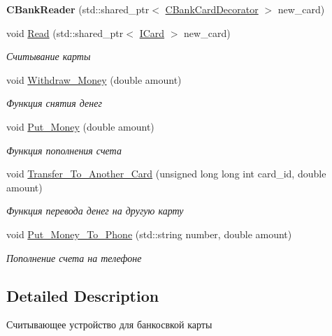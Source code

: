 \begin{DoxyCompactItemize}
\item 
{\bfseries C\+Bank\+Reader} (std\+::shared\+\_\+ptr$<$ \hyperlink{classCBankCardDecorator}{C\+Bank\+Card\+Decorator} $>$ new\+\_\+card)\hypertarget{classCBankReader_a27fe18f60a46d95d8e8b022785bec641}{}\label{classCBankReader_a27fe18f60a46d95d8e8b022785bec641}

\item 
void \hyperlink{classCBankReader_a69ed3dcbbd5fe76cc8b1e1db2b841128}{Read} (std\+::shared\+\_\+ptr$<$ \hyperlink{classICard}{I\+Card} $>$ new\+\_\+card)
\begin{DoxyCompactList}\small\item\em Считывание карты \end{DoxyCompactList}\item 
void \hyperlink{classCBankReader_afd2d3b073729079d75460e4cfde0ccbc}{Withdraw\+\_\+\+Money} (double amount)
\begin{DoxyCompactList}\small\item\em Функция снятия денег \end{DoxyCompactList}\item 
void \hyperlink{classCBankReader_a1a64f1bc129b6238ce382317d3ff8d24}{Put\+\_\+\+Money} (double amount)
\begin{DoxyCompactList}\small\item\em Функция пополнения счета \end{DoxyCompactList}\item 
void \hyperlink{classCBankReader_aabeebe40ce562468fa876e83638a2c04}{Transfer\+\_\+\+To\+\_\+\+Another\+\_\+\+Card} (unsigned long long int card\+\_\+id, double amount)
\begin{DoxyCompactList}\small\item\em Функция перевода денег на другую карту \end{DoxyCompactList}\item 
void \hyperlink{classCBankReader_ae138c3644cd3a14e2f36a58349efab59}{Put\+\_\+\+Money\+\_\+\+To\+\_\+\+Phone} (std\+::string number, double amount)
\begin{DoxyCompactList}\small\item\em Пополнение счета на телефоне \end{DoxyCompactList}\end{DoxyCompactItemize}


\subsection{Detailed Description}
Считывающее устройство для банкосвкой карты 

